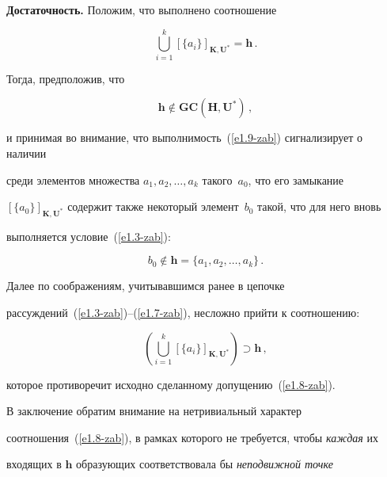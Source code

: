 \medskip



\noindent

\textbf{Достаточность.} Положим, что выполнено соотношение

\begin{equation}

\mathop{\bigcup}\limits_{i=1}^k  [\{a_i\}]_{\mathbf{K},\mathbf{U}^*} = \mathbf{h}\,.

\label{e1.8-zab}

\end{equation}

Тогда, предположив, что

\begin{equation}

\mathbf{h}\not\in \mathbf{GC}(\mathbf{H},\mathbf{U}^*)\,,

\label{e1.9-zab}

\end{equation}

и принимая во внимание, что выполнимость~(\ref{e1.9-zab}) сигнализирует о наличии 

среди элементов множества $a_1, a_2, \ldots , a_k$ такого~$a_0$, что его замыкание 

$[\{a_0\}]_{\mathbf{K},\mathbf{U}^*}$ содержит также некоторый элемент~$b_0$ такой, что для него вновь 

выполняется условие~(\ref{e1.3-zab}):

$$

b_0 \not\in \mathbf{h} = \{a_1, a_2, \ldots, a_k\}\,.

$$

Далее по соображениям, учитывавшимся ранее в цепочке 

рассуждений~(\ref{e1.3-zab})--(\ref{e1.7-zab}), несложно прийти к соотношению:

$$

\left(\mathop{\bigcup}\limits_{i=1}^k [\{a_i\}]_{\mathbf{K},\mathbf{U}^*}\right) \supset\mathbf{h}\, ,

$$

которое противоречит исходно сделанному допущению~(\ref{e1.8-zab}).



     В заключение обратим внимание на нетривиальный характер 

соотношения~(\ref{e1.8-zab}), в рамках которого не требуется, чтобы \textit{каждая} их 

входящих в $\mathbf{h}$ образу\-ющих соответствовала бы \textit{неподвижной точке} 

